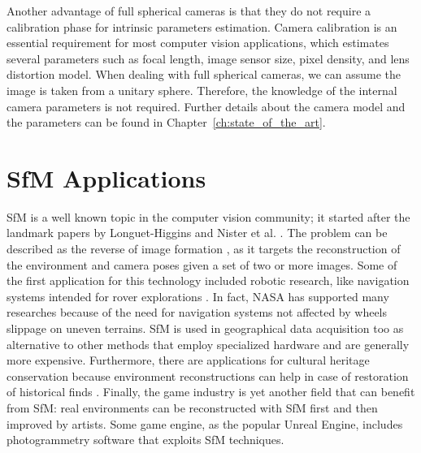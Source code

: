 Another advantage of full spherical cameras is that they do not require a calibration phase for intrinsic parameters estimation. Camera calibration is an essential requirement for most computer vision applications, which estimates several parameters such as focal length, image 
sensor size, pixel density, and lens distortion model. When dealing with full spherical cameras, we can assume the image is taken from a unitary sphere. Therefore, the knowledge of the internal camera parameters is not required. 
Further details about the camera model and the parameters can be found in Chapter~\ref{ch:state_of_the_art}.

\section{SfM Applications}
SfM is a well known topic in the computer vision community; it started after 
the landmark papers by Longuet-Higgins \cite{longuet1981computer} and
Nister et al. \cite{moravec1980obstacle}.
The problem can be described as the reverse of image formation
\cite{Wei2013}, as it targets the reconstruction of the environment 
and camera poses given a set of two or more images.
Some of the first application for this technology included robotic research, 
like navigation systems intended for rover explorations 
\cite{moravec1980obstacle,durrant1996localization}. In fact, NASA has supported
many researches because of the need for navigation systems not affected by wheels
slippage on uneven terrains.
SfM is used in geographical data acquisition too
\cite{fonstad2013topographic, westoby2012structure, james2012straightforward}
as alternative to other methods that employ specialized hardware and are generally more expensive.
Furthermore, there are applications for cultural heritage conservation because 
environment reconstructions can help in case of restoration of historical finds
\cite{kraus2007photogrammetry}.
Finally, the game industry is yet another field that can benefit from 
SfM: real environments can be reconstructed with SfM first and then 
improved by artists. Some game engine, as the popular Unreal Engine,
includes photogrammetry software that exploits SfM techniques. 
